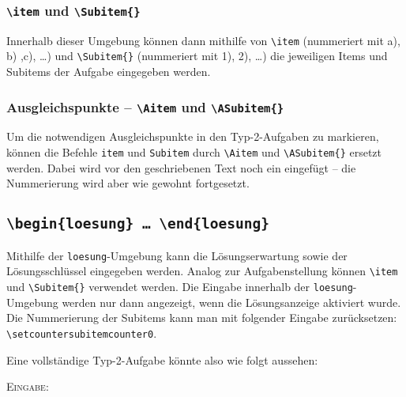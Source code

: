 \documentclass[a4paper,12pt]{article}
\begin{document}
\subsubsection{\texttt{\textbackslash item} und \texttt{\textbackslash Subitem\{\}}}
Innerhalb dieser Umgebung können dann mithilfe von \texttt{\textbackslash item} (nummeriert mit a), b) ,c), \ldots) und \texttt{\textbackslash Subitem\{\}} (nummeriert mit 1), 2), \ldots) die jeweiligen Items und Subitems der Aufgabe eingegeben werden. \leer

\subsubsection{Ausgleichspunkte -- \texttt{\textbackslash Aitem} und \texttt{\textbackslash ASubitem\{\}}}
Um die notwendigen Ausgleichspunkte in den Typ-2-Aufgaben zu markieren, können die Befehle \texttt{item} und \texttt{Subitem} durch \texttt{\textbackslash Aitem} und \texttt{\textbackslash ASubitem\{\}} ersetzt werden. Dabei wird vor den geschriebenen Text noch ein  eingefügt -- die Nummerierung wird aber wie gewohnt fortgesetzt.  

\subsection{\texttt{\textbackslash begin\{loesung\} \ldots\ \textbackslash end\{loesung\}}}
Mithilfe der \texttt{loesung}-Umgebung kann die Lösungserwartung sowie der Lösungsschlüssel eingegeben werden. Analog zur Aufgabenstellung können \texttt{\textbackslash item} und \texttt{\textbackslash Subitem\{\}} verwendet werden. Die Eingabe innerhalb der \texttt{loesung}-Umgebung werden nur dann angezeigt, wenn die Lösungsanzeige aktiviert wurde. Die Nummerierung der Subitems kann man mit folgender Eingabe zurücksetzen: \texttt{\textbackslash setcounter{subitemcounter}{0}}.\leer

Eine vollständige Typ-2-Aufgabe könnte also wie folgt aussehen:

\textsc{Eingabe:}
\end{document}
